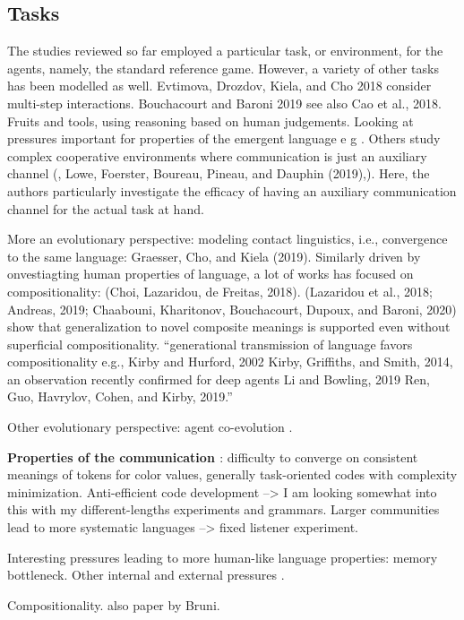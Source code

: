 \subsection{Tasks}


The studies reviewed so far employed a particular  task, or environment, for the agents, namely, the standard reference game. However, a variety of other tasks has been modelled as well.
Evtimova, Drozdov, Kiela, and Cho 2018 consider multi-step interactions. Bouchacourt and Baroni 2019 see also Cao et al., 2018. Fruits and tools, using reasoning based on human judgements.
Looking at pressures important for properties of the emergent language e g  \parencite{bouchacourt2018agents}. 
Others study complex cooperative environments where communication is just an auxiliary channel (\parencite{das2019tarmac}, Lowe, Foerster, Boureau, Pineau, and Dauphin (2019),). Here, the authors particularly investigate the efficacy of having an auxiliary communication channel for the actual task at hand.

More an evolutionary perspective: modeling contact linguistics, i.e., convergence to the same language: Graesser, Cho, and Kiela (2019). Similarly driven by onvestiagting human properties of language, a lot of works has focused on compositionality: (Choi, Lazaridou, de Freitas, 2018). (Lazaridou et al., 2018; Andreas, 2019; Chaabouni, Kharitonov, Bouchacourt, Dupoux, and Baroni, 2020) show that generalization to novel composite meanings is supported even without superficial compositionality. 
``generational transmission of language favors compositionality e.g., Kirby and Hurford, 2002 Kirby, Griffiths, and Smith, 2014, an observation recently confirmed for deep agents Li and Bowling, 2019 Ren, Guo, Havrylov, Cohen, and Kirby, 2019.''

Other evolutionary perspective: agent co-evolution \parencite{dagan2020co}.

\textbf{Properties of the communication \parencite{lazaridou2020multi}}: difficulty to converge on consistent meanings of tokens for color values, generally task-oriented codes with complexity minimization. Anti-efficient code development --> I am looking somewhat into this with my different-lengths experiments and grammars.  Larger communities lead to more systematic languages --> fixed listener experiment.

Interesting pressures leading to more human-like language properties: memory bottleneck. Other internal and external pressures \parencite{luna2020internal}. 


Compositionality. also paper by Bruni.



